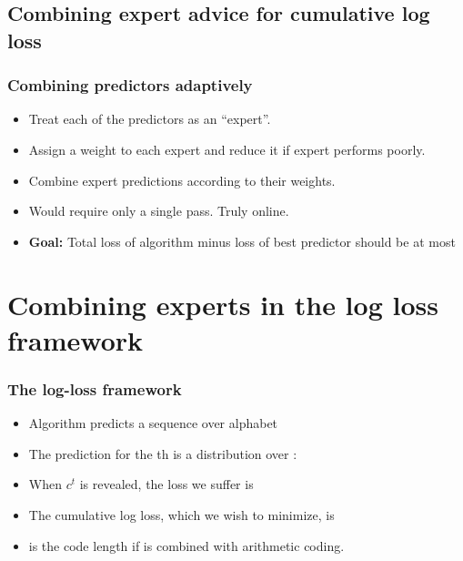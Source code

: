 \documentclass[handout]{beamer}
\begin{document}
\subsection{Combining expert advice for cumulative log loss}

\begin{frame}
\frametitle{Combining predictors adaptively}
\begin{itemize}
\item Treat each of the predictors as an ``expert''.
\item Assign a weight to each expert and reduce it if expert performs poorly.
\item Combine expert predictions according to their weights.
\item Would require only a single pass. Truly online.
\item {\bf Goal:} Total loss of algorithm minus loss of best predictor should be at most 
\end{itemize}
\end{frame}

\section{Combining experts in the log loss framework}

\begin{frame}
\frametitle{The log-loss framework}
\begin{itemize}
\item Algorithm  predicts a sequence 
over alphabet 
\item The prediction for the th is a distribution over \R{$\Sigma$}:\\
\item When $c^t$ is revealed, the loss we suffer is 
\item The {\color{blue}cumulative log loss}, which we wish to minimize, 
is 
\item {} is the code length if  is combined with arithmetic coding.
\end{itemize}
\end{frame}
\end{document}
